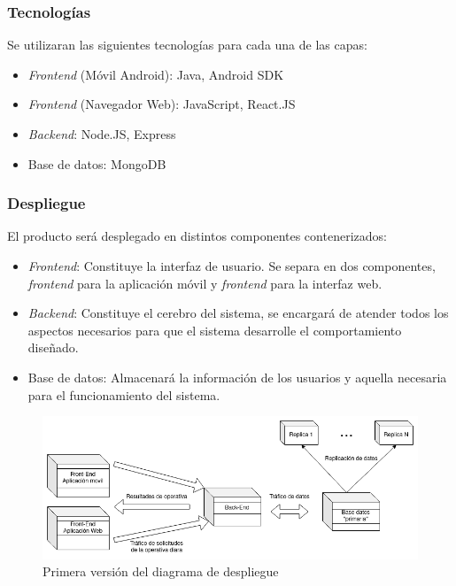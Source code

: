 \documentclass{article}
\begin{document}
\pagebreak

\subsubsection*{Tecnologías}

Se utilizaran las siguientes tecnologías para cada una de las capas:

\begin{itemize}
    \setlength\itemsep{0em}
    \item \textit{Frontend} (Móvil Android): Java, Android SDK
    \item \textit{Frontend} (Navegador Web): JavaScript, React.JS
    \item \textit{Backend}: Node.JS, Express
    \item Base de datos: MongoDB
\end{itemize}

\subsubsection*{Despliegue}

El producto será desplegado en distintos componentes contenerizados:

\begin{itemize}
    \setlength\itemsep{0em}
    \item \textit{Frontend}: Constituye la interfaz de usuario. Se separa en dos componentes, \textit{frontend} para la aplicación móvil y \textit{frontend} para la interfaz web.
    \item \textit{Backend}: Constituye el cerebro del sistema, se encargará de atender todos los aspectos necesarios para que el sistema desarrolle el comportamiento diseñado.
    \item Base de datos: Almacenará la información de los usuarios y aquella necesaria para el funcionamiento del sistema.
\end{itemize}

\begin{figure}[H]
    \centering
    \begin{adjustbox}{max size={\textwidth}{\textheight}}
        \includegraphics{../images/desplieguev1.png}
    \end{adjustbox}
    \caption{Primera versión del diagrama de despliegue}
    \label{despliegueV1}
\end{figure}
\end{document}
